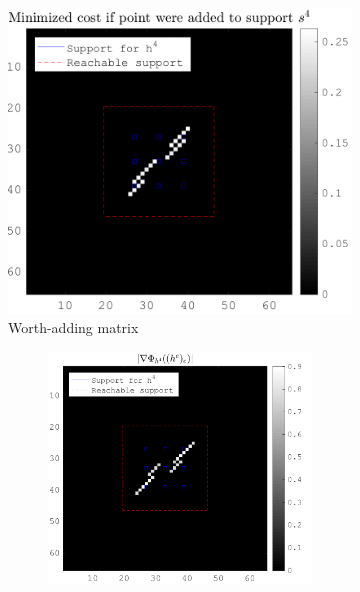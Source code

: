 \begin{figure}[!h]\centering
\begin{subfigure}[b]{0.49\textwidth}\centering
\includegraphics[width=\textwidth]{figures/xp_grad_iterations/xp_128x128_sc2_angl1_K3_S3_node4_objmatrix_bestvalues.png}
\caption{Worth-adding matrix}
\end{subfigure}
\begin{subfigure}[b]{0.49\textwidth}\centering
	\begin{subfigure}[b]{0.49\textwidth}\centering
	\includegraphics[width=\textwidth]{figures/xp_grad_iterations/xp_128x128_sc2_angl1_K3_S3_node4_1thiteration_partgrad4_bestvalues.png}

\end{subfigure}
\end{subfigure}
\end{figure}
